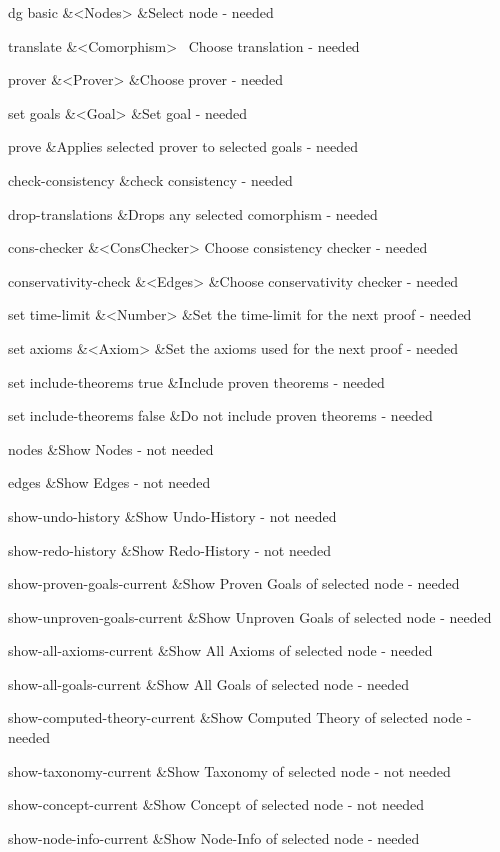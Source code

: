 \documentclass{article}
\begin{document}
dg basic
&{\textless}Nodes{\textgreater}
&Select node - needed

translate
&{\textless}Comorphism{\textgreater}
\ Choose translation - needed

prover
&{\textless}Prover{\textgreater}
&Choose prover - needed

set goals
&{\textless}Goal{\textgreater}
&Set goal - needed

prove
&Applies
selected prover to selected goals - needed

check-consistency &check
consistency - needed

drop-translations &Drops
any selected comorphism - needed

cons-checker
&{\textless}ConsChecker{\textgreater} Choose
consistency checker - needed

conservativity-check &{\textless}Edges{\textgreater}
&Choose conservativity checker - needed

set time-limit &{\textless}Number{\textgreater}
&Set the time-limit for the next proof - needed

set axioms
&{\textless}Axiom{\textgreater}
&Set the axioms used for the next proof - needed

set include-theorems true &Include proven
theorems - needed

set include-theorems false &Do not include
proven theorems - needed

nodes
&Show
Nodes - not needed

edges
&Show
Edges - not needed

show-undo-history &Show
Undo-History - not needed

show-redo-history &Show
Redo-History - not needed

show-proven-goals-current &Show Proven
Goals of selected node - needed

show-unproven-goals-current &Show Unproven Goals of
selected node - needed

show-all-axioms-current &Show All
Axioms of selected node - needed

show-all-goals-current &Show All
Goals of selected node - needed

show-computed-theory-current &Show Computed Theory of
selected node - needed

show-taxonomy-current &Show
Taxonomy of selected node - not needed

show-concept-current &Show
Concept of selected node - not needed

show-node-info-current &Show
Node-Info of selected node - needed
\end{document}
